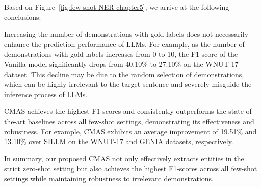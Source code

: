 Based on Figure~\ref{fig:few-shot NER-chapter5}, we arrive at the following conclusions:
\begin{enumerate*}[label=(\roman*),nosep,leftmargin=*]
    \item Increasing the number of demonstrations with gold labels does not necessarily enhance the prediction performance of \acp{LLM}. For example, as the number of demonstrations with gold labels increases from 0 to 10, the F1-score of the Vanilla model significantly drops from 40.10\% to 27.10\% on the WNUT-17 dataset. This decline may be due to the random selection of demonstrations, which can be highly irrelevant to the target sentence and severely misguide the inference process of LLMs.
    \item \ac{CMAS} achieves the highest F1-scores and consistently outperforms the state-of-the-art baselines across all few-shot settings, demonstrating its effectiveness and robustness. For example, \ac{CMAS} exhibits an average improvement of 19.51\% and 13.10\% over SILLM on the WNUT-17 and GENIA datasets, respectively.
\end{enumerate*}

In summary, our proposed \ac{CMAS} not only effectively extracts entities in the strict zero-shot setting but also achieves the highest F1-scores across all few-shot settings while maintaining robustness to irrelevant demonstrations.

\begin{figure*}
  \centering
    \quad
    \quad
    \caption{Few-shot NER results (F1) on WikiGold, WNUT-17, and GENIA.}
  \label{fig:few-shot NER-chapter5}
\end{figure*}


